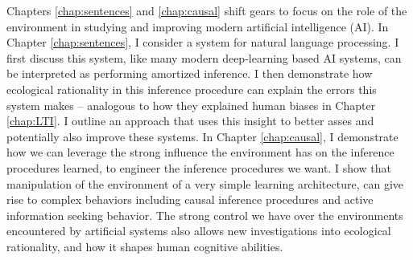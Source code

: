 Chapters \ref{chap:sentences} and \ref{chap:causal} shift gears to focus on the role of the environment in studying and improving modern artificial intelligence (AI).  In Chapter \ref{chap:sentences}, I consider a system for natural language processing. I first discuss this system, like many modern deep-learning based AI systems, can be interpreted as performing amortized inference. I then demonstrate how ecological rationality in this inference procedure can explain the errors this system makes -- analogous to how they explained human biases in Chapter \ref{chap:LTI}. I outline an approach that uses this insight to better asses and potentially also improve these systems. In Chapter \ref{chap:causal}, I demonstrate how we can leverage the strong influence the environment has on the inference procedures learned, to engineer the inference procedures we want. I show that manipulation of the environment of a very simple learning architecture, can give rise to complex behaviors including causal inference procedures and active information seeking behavior. The strong control we have over the environments encountered by artificial systems also allows new investigations into ecological rationality, and how it shapes human cognitive abilities.